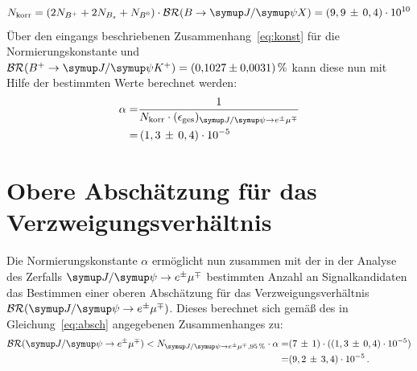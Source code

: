 %
\begin{equation}
  N_\text{korr}=(2N_{B^{+}}+2N_{B_s}+N_{B^{0}})\cdot\mathcal{BR}(B\rightarrow\jpsi X)=(9,9\,\pm\,0,4)\cdot10^{10}
  \label{eq:jpsi}
\end{equation}
%
Über den eingangs beschriebenen Zusammenhang~\eqref{eq:konst} für die Normierungskonstante und $\mathcal{BR}(B^{+}\rightarrow\jpsi K^{+}) = \SI{0.1027(31)}{\percent}$ \cite{pdg} kann diese nun mit Hilfe der bestimmten Werte berechnet werden:
%
\begin{align*}
  \alpha=&\frac{1}{N_\text{korr}\cdot(\epsilon_{\text{ges}})_{\signal}} \\
  =&\,(1,3\,\pm\,0,4)\cdot10^{-5}\\
\end{align*}
\section{Obere Abschätzung für das Verzweigungsverhältnis}
Die Normierungskonstante $\alpha$ ermöglicht nun zusammen mit der in der Analyse des Zerfalls $\signal$ bestimmten Anzahl an Signalkandidaten das Bestimmen einer oberen Abschätzung für das Verzweigungsverhältnis $\mathcal{BR}(\signal)$. Dieses berechnet sich gemäß des in Gleichung~\eqref{eq:absch} angegebenen Zusammenhanges zu:
%
\begin{equation}
  \begin{split}
    \mathcal{BR}(\signal)<N_{\signal, \SI{95}{\percent}}\cdot\alpha=& (7\,\pm\,1)\cdot((1,3\,\pm\,0,4)\cdot10^{-5})\\=& (9,2\,\pm\,3,4)\cdot10^{-5} \, .
  \end{split}
\end{equation}
%

\nocite{biblatex, make, toolbox, gitbash, siunitx}
